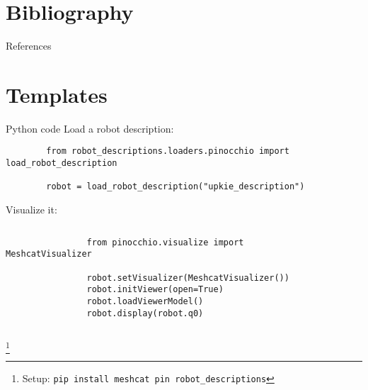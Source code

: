 \documentclass[9pt, aspectratio=43]{beamer}
\newcommand\blfootnote[1]{%
  \begingroup
  \renewcommand\thefootnote{}%
  \footnote{#1}%
  \addtocounter{footnote}{-1}%
  \endgroup
}
\begin{document}

\section*{Bibliography}

\renewcommand*{\bibfont}{\footnotesize}
\begin{frame}[allowframebreaks]{References}
    \printbibliography[heading=none]
\end{frame}

\section*{Templates}

\begin{frame}[fragile]{Python code}
    Load a robot description:
    \begin{verbatim}
        from robot_descriptions.loaders.pinocchio import load_robot_description

        robot = load_robot_description("upkie_description")
    \end{verbatim}
    Visualize it:
    \begin{columns}
        \begin{column}{0.75\columnwidth}
            \begin{verbatim}
                from pinocchio.visualize import MeshcatVisualizer

                robot.setVisualizer(MeshcatVisualizer())
                robot.initViewer(open=True)
                robot.loadViewerModel()
                robot.display(robot.q0)
            \end{verbatim}
        \end{column}
        \begin{column}{0.24\columnwidth}
            \begin{figure}
                \centering
            \end{figure}
        \end{column}
    \end{columns}
    \blfootnote{
        Setup: \texttt{pip install meshcat pin robot_descriptions}
    }
\end{frame}
\end{document}
